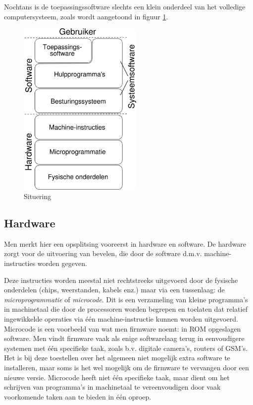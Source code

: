 Nochtans is de toepassingssoftware slechts een klein onderdeel van
het volledige computersysteem, zoals wordt aangetoond in figuur \ref{situering}.

\begin{figure}
\begin{center}
\includegraphics[width=60mm]{images/fig0101.png}
\end{center}
\caption{Situering}
\label{situering}
\end{figure}

\subsection{Hardware}

Men merkt hier een opsplitsing vooreerst in hardware en
software. De hardware zorgt voor de uitvoering van bevelen, die door
de software d.m.v. machine-instructies worden gegeven.

Deze instructies worden meestal niet rechtstreeks uitgevoerd
door de fysische onderdelen (chips, weerstanden, kabels enz.) maar via
een tussenlaag: de \emph{microprogrammatie} of
\emph{microcode}. Dit is een verzameling van kleine
programma's in machinetaal die door de processoren worden begrepen en
toelaten dat relatief ingewikkelde operaties via \'e\'en
machine-instructie kunnen worden uitgevoerd. Microcode is een
voorbeeld van wat men firmware noemt: in ROM opgeslagen software. Men
vindt firmware vaak als enige softwarelaag terug in eenvoudigere
systemen met \'e\'en specifieke taak, zoals b.v. digitale camera's,
routers of GSM's. Het is bij deze toestellen over het algemeen niet
mogelijk extra software te installeren, maar soms is het wel mogelijk
om de firmware te vervangen door een nieuwe versie. Microcode heeft
niet \'e\'en specifieke taak, maar dient om het schrijven van programma's
in machinetaal te vereenvoudigen door vaak voorkomende taken aan te
bieden in \'e\'en oproep.

